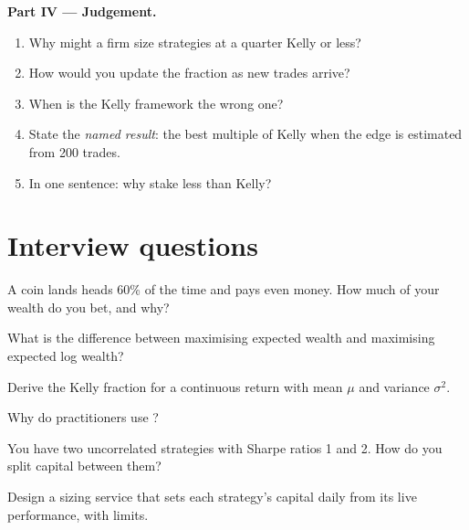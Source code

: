 \begin{problem}
\medskip\noindent\textbf{Part IV --- Judgement.}
\begin{enumerate}[resume]
\item Why might a firm size strategies at a quarter Kelly or less?
\item How would you update the fraction as new trades arrive?
\item When is the Kelly framework the wrong one?
\item State the \emph{named result}: the best multiple of Kelly when the edge is estimated
from 200 trades.
\item In one sentence: why stake less than Kelly?
\end{enumerate}
\end{problem}

\section{Interview questions}

\begin{interviewq}\label{iq:m2:thinking-in-expected-value:1}
A coin lands heads 60\% of the time and pays even money. How much of your wealth do you
bet, and why?
\end{interviewq}

\begin{interviewq}\label{iq:m2:thinking-in-expected-value:2}
What is the difference between maximising expected wealth and maximising expected log
wealth?
\end{interviewq}

\begin{interviewq}\label{iq:m2:thinking-in-expected-value:3}
Derive the Kelly fraction for a continuous return with mean $\mu$ and variance $\sigma^2$.
\end{interviewq}

\begin{interviewq}\label{iq:m2:thinking-in-expected-value:4}
Why do practitioners use ?
\end{interviewq}

\begin{interviewq}\label{iq:m2:thinking-in-expected-value:5}
You have two uncorrelated strategies with Sharpe ratios 1 and 2. How do you split capital
between them?
\end{interviewq}

\begin{interviewq}\label{iq:m2:thinking-in-expected-value:6}
Design a sizing service that sets each strategy's capital daily from its live
performance, with limits.
\end{interviewq}
